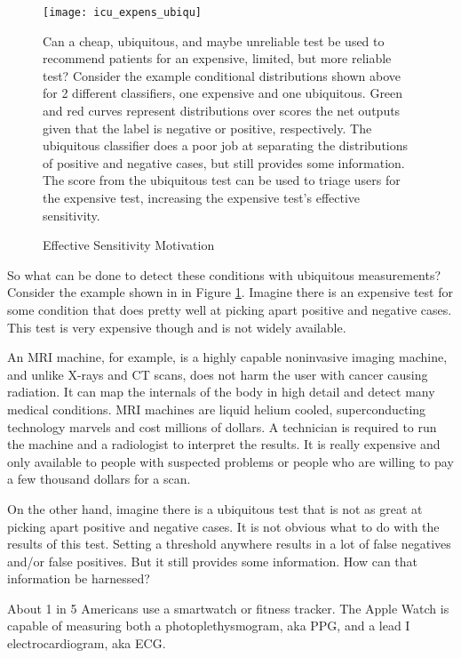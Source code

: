 \begin{figure}
\begin{center}
\texttt{[image: icu\_expens\_ubiqu]}
\end{center}
\caption{Effective Sensitivity Motivation}
\vspace{12px}
Can a cheap, ubiquitous, and maybe unreliable test be used to recommend patients for an expensive, limited, but more reliable test?  Consider the example conditional distributions shown above for 2 different classifiers, one expensive and one ubiquitous.  Green and red curves represent distributions over scores the net outputs given that the label is negative or positive, respectively.  The ubiquitous classifier does a poor job at separating the distributions of positive and negative cases, but still provides some information.  The score from the ubiquitous test can be used to triage users for the expensive test, increasing the expensive test's effective sensitivity.
\label{fig:icu_expens_ubiqu}
\end{figure}

So what can be done to detect these conditions with ubiquitous measurements?   Consider the example shown in in Figure \ref{fig:icu_expens_ubiqu}.  Imagine there is an expensive test for some condition that does pretty well at picking apart positive and negative cases.  This test is very expensive though and is not widely available.  

An MRI machine, for example, is a highly capable noninvasive imaging machine, and unlike X-rays and CT scans, does not harm the user with cancer causing radiation.  It can map the internals of the body in high detail and detect many medical conditions.  MRI machines are liquid helium cooled, superconducting technology marvels and cost millions of dollars.  A technician is required to run the machine and a radiologist to interpret the results.  It is really expensive and only available to people with suspected problems or people who are willing to pay a few thousand dollars for a scan.

On the other hand, imagine there is a ubiquitous test that is not as great at picking apart positive and negative cases.  It is not obvious what to do with the results of this test.  Setting a threshold anywhere results in a lot of false negatives and/or false positives. But it still provides some information.  How can that information be harnessed? 

About 1 in 5 Americans use a smartwatch or fitness tracker.  The Apple Watch is capable of measuring both a photoplethysmogram, aka PPG, and a lead I electrocardiogram, aka ECG.

